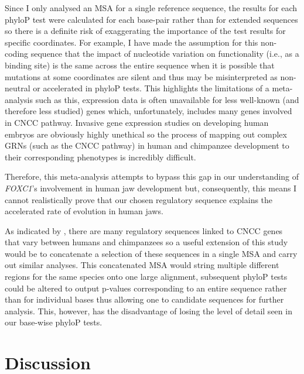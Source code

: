 \documentclass{article}[12pt]
\begin{document}
Since I only analysed an \Gls{MSA} for a single reference sequence, the results for each phyloP test were calculated for each base-pair rather than for extended sequences so there is a definite risk of exaggerating the importance of the test results for specific coordinates. For example, I have made the assumption for this non-coding sequence that the impact of nucleotide variation on functionality (i.e., as a binding site) is the same across the entire sequence when it is possible that mutations at some coordinates are silent and thus may be misinterpreted as non-neutral or accelerated in phyloP tests. This highlights the limitations of a meta-analysis such as this, expression data is often unavailable for less well-known (and therefore less studied) genes which, unfortunately, includes many genes involved in \Gls{CNCC} pathway. Invasive gene expression studies on developing human embryos are obviously highly unethical so the process of mapping out complex \Glspl{GRN} (such as the CNCC pathway) in human and chimpanzee development to their corresponding phenotypes is incredibly difficult. 

Therefore, this meta-analysis attempts to bypass this gap in our understanding of \emph{FOXC1}’s involvement in human jaw development but, consequently, this means I cannot realistically prove that our chosen regulatory sequence explains the accelerated rate of evolution in human jaws.

As indicated by \cite{Prescott2015}, there are many regulatory sequences linked to \Gls{CNCC} genes that vary between humans and chimpanzees so a useful extension of this study would be to concatenate a selection of these sequences in a single \Gls{MSA} and carry out similar analyses. This concatenated MSA would string multiple different regions for the same species onto one large alignment, subsequent phyloP tests could be altered to output p-values corresponding to an entire sequence rather than for individual bases thus allowing one to candidate sequences for further analysis. This, however, has the disadvantage of losing the level of detail seen in our base-wise phyloP tests.

\section*{Discussion}
\end{document}
